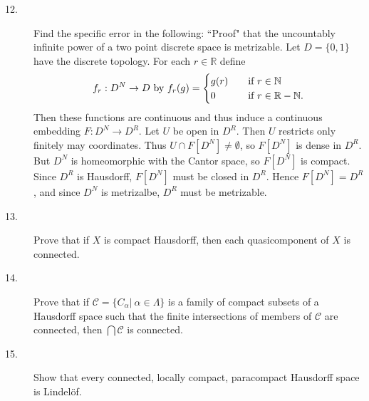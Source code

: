 \documentclass{article}
\def\R{\mathbb R}
\def\N{\mathbb N}
\begin{document}
\begin{description}
\item[12.]
Find the specific error in the following: ``Proof" that  the uncountably
infinite power of a two point discrete space is metrizable. Let $D=\{0,1\}$
have the discrete topology. For each $r \in \R$ define
$$f_r: D^N \to D \hbox{\ by\ } f_r(g) =
        \begin{cases}
          g(r) \quad &\hbox{if\ } r\in \N \\
          0 \quad &\hbox{if\ } r \in \R - \N.
          \end{cases}$$
Then these functions are continuous and thus induce a continuous embedding
$F: D^N \to D^R$. Let $U$ be open in $D^R$. Then $U$ restricts only finitely
may coordinates. Thus $U \cap F[D^N] \neq \emptyset$, so $F[D^N]$ is
dense in $D^R$. But $D^N$ is homeomorphic with the Cantor space, so
$F[D^N]$ is compact. Since $D^R$ is Hausdorff, $F[D^N]$ must be closed in
$D^R$. Hence $F[D^N] = D^R$, and since $D^N$ is metrizalbe, $D^R$ must
be metrizable.

\item[13.]
Prove that if $X$ is compact Hausdorff, then each quasicomponent of $X$
is connected.

\item[14.]
Prove that if ${\mathcal C} = \{C_\alpha | \ \alpha \in \Lambda\}$ is a
family of compact subsets of a Hausdorff space such that the finite intersections
of members of $\mathcal C$ are connected, then $\bigcap {\mathcal C}$ is
connected.

\item[15.]
Show that every connected, locally compact, paracompact Hausdorff space is
Lindel\"of.





\end{description}    
\end{document}
